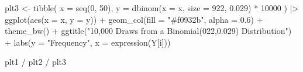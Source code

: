 \documentclass[
  letterpaper,
  DIV=11,
  numbers=noendperiod]{scrreport}
\newenvironment{Shaded}{\begin{snugshade}}{\end{snugshade}}
\newcommand{\AttributeTok}[1]{\textcolor[rgb]{0.40,0.45,0.13}{#1}}
\newcommand{\DecValTok}[1]{\textcolor[rgb]{0.68,0.00,0.00}{#1}}
\newcommand{\FloatTok}[1]{\textcolor[rgb]{0.68,0.00,0.00}{#1}}
\newcommand{\FunctionTok}[1]{\textcolor[rgb]{0.28,0.35,0.67}{#1}}
\newcommand{\NormalTok}[1]{\textcolor[rgb]{0.00,0.23,0.31}{#1}}
\newcommand{\OtherTok}[1]{\textcolor[rgb]{0.00,0.23,0.31}{#1}}
\newcommand{\SpecialCharTok}[1]{\textcolor[rgb]{0.37,0.37,0.37}{#1}}
\newcommand{\StringTok}[1]{\textcolor[rgb]{0.13,0.47,0.30}{#1}}
\begin{document}
\begin{Shaded}
\begin{Highlighting}[]
\NormalTok{plt3 }\OtherTok{\textless{}{-}} \FunctionTok{tibble}\NormalTok{(}
  \AttributeTok{x =} \FunctionTok{seq}\NormalTok{(}\DecValTok{0}\NormalTok{, }\DecValTok{50}\NormalTok{),}
  \AttributeTok{y =} \FunctionTok{dbinom}\NormalTok{(}\AttributeTok{x =}\NormalTok{ x, }\AttributeTok{size =} \DecValTok{922}\NormalTok{, }\FloatTok{0.029}\NormalTok{) }\SpecialCharTok{*} \DecValTok{10000}
\NormalTok{) }\SpecialCharTok{|\textgreater{}} 
\FunctionTok{ggplot}\NormalTok{(}\FunctionTok{aes}\NormalTok{(}\AttributeTok{x =}\NormalTok{ x, }\AttributeTok{y =}\NormalTok{ y)) }\SpecialCharTok{+} 
\FunctionTok{geom\_col}\NormalTok{(}\AttributeTok{fill =} \StringTok{"\#f0932b"}\NormalTok{, }\AttributeTok{alpha =} \FloatTok{0.6}\NormalTok{) }\SpecialCharTok{+} 
\FunctionTok{theme\_bw}\NormalTok{() }\SpecialCharTok{+} 
\FunctionTok{ggtitle}\NormalTok{(}\StringTok{"10,000 Draws from a Binomial(022,0.029) Distribution"}\NormalTok{) }\SpecialCharTok{+} 
\FunctionTok{labs}\NormalTok{(}\AttributeTok{y =} \StringTok{"Frequency"}\NormalTok{, }\AttributeTok{x =} \FunctionTok{expression}\NormalTok{(Y[i]))}

\NormalTok{plt1 }\SpecialCharTok{/}\NormalTok{ plt2 }\SpecialCharTok{/}\NormalTok{ plt3}
\end{Highlighting}
\end{Shaded}
\end{document}
